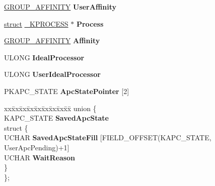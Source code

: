 \begin{DoxyCompactItemize}
\hyperlink{struct___g_r_o_u_p___a_f_f_i_n_i_t_y}{G\+R\+O\+U\+P\+\_\+\+A\+F\+F\+I\+N\+I\+TY} {\bfseries User\+Affinity}
\item 
\mbox{\label{struct___k_t_h_r_e_a_d_af160068259d5a309cf48334a8c384fa2}} 
\hyperlink{interfacestruct}{struct} \hyperlink{struct___k_p_r_o_c_e_s_s}{\+\_\+\+K\+P\+R\+O\+C\+E\+SS} $\ast$ {\bfseries Process}
\item 
\mbox{\label{struct___k_t_h_r_e_a_d_a1cc694bf97ccff9d7f03e26560748786}} 
\hyperlink{struct___g_r_o_u_p___a_f_f_i_n_i_t_y}{G\+R\+O\+U\+P\+\_\+\+A\+F\+F\+I\+N\+I\+TY} {\bfseries Affinity}
\item 
\mbox{\label{struct___k_t_h_r_e_a_d_a22045b7b55fd7b754c1ebf3d65103e70}} 
U\+L\+O\+NG {\bfseries Ideal\+Processor}
\item 
\mbox{\label{struct___k_t_h_r_e_a_d_a13c263657ea07c24ed17fad643741aa3}} 
U\+L\+O\+NG {\bfseries User\+Ideal\+Processor}
\item 
\mbox{\label{struct___k_t_h_r_e_a_d_aecddeacb6b201b77356b9115c4c0174c}} 
P\+K\+A\+P\+C\+\_\+\+S\+T\+A\+TE {\bfseries Apc\+State\+Pointer} \mbox{[}2\mbox{]}
\item 
\mbox{\label{struct___k_t_h_r_e_a_d_a4cdaa8a9b6abd20fadd220b38df1b030}} 
\begin{tabbing}
xx\=xx\=xx\=xx\=xx\=xx\=xx\=xx\=xx\=\kill
union \{\\
\>KAPC\_STATE {\bfseries SavedApcState}\\
\mbox{\label{union___k_t_h_r_e_a_d_1_1_0D2102_ad7bca08be70b9455e62527eaf11c677b}} 
\>struct \{\\
\>\>UCHAR {\bfseries SavedApcStateFill} \mbox{[}FIELD\_OFFSET(KAPC\_STATE, \\
\>\>\>UserApcPending)+1\mbox{]}\\
\>\>UCHAR {\bfseries WaitReason}\\
\>\} \\
\}; \\


\end{tabbing}
\end{DoxyCompactItemize}
